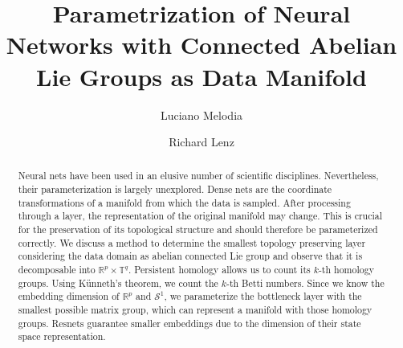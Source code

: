 \documentclass[envcountsect,runningheads]{llncs}
\begin{document}
%
\title{Parametrization of Neural Networks with Connected Abelian Lie Groups as Data Manifold}
%
%
\author{Luciano Melodia \\
\and Richard Lenz}
%
%
%
\maketitle              %
%
\begin{abstract}
Neural nets have been used in an elusive number of scientific disciplines. Nevertheless, their parameterization is largely unexplored. Dense nets are the coordinate transformations of a manifold from which the data is sampled. After processing through a layer, the representation of the original manifold may change. This is crucial for the preservation of its topological structure and should therefore be parameterized correctly. We discuss a method to determine the smallest topology preserving layer considering the data domain as abelian connected Lie group and observe that it is decomposable into $\mathbb{R}^p \times \mathbb {T}^q$. Persistent homology allows us to count its $k$-th homology groups. Using Künneth's theorem, we count the $k$-th Betti numbers. Since we know the embedding dimension of $\mathbb{R}^p$ and $\mathcal{S}^1$, we parameterize the bottleneck layer with the smallest possible matrix group, which can represent a manifold with those homology groups. Resnets guarantee smaller embeddings due to the dimension of their state space representation.

\end{abstract}
\end{document}
